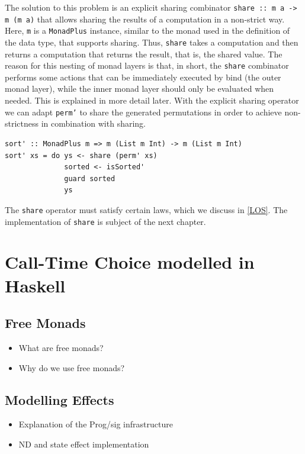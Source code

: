 \documentclass[a4paper, 11pt, fleqn, twoside]{scrreprt}
\begin{document}
The solution to this problem is an explicit sharing combinator 
\texttt{share :: m a -> m (m a)} that allows sharing the results 
of a computation in a non-strict way. Here, \texttt{m} is a 
\texttt{MonadPlus} instance, similar to the monad used in the 
definition of the data type, that supports sharing. Thus, 
\texttt{share} takes a  computation and then returns a computation 
that returns the result, that is, the shared value. The reason for this nesting 
of monad layers is that, in short, the \texttt{share} combinator 
performs some actions that can be immediately executed by bind (the outer monad 
layer), while the inner monad layer should only be evaluated when needed. This 
is explained in more detail later.
With the explicit sharing operator we can adapt \texttt{perm'} to
share the generated permutations in order to achieve non-strictness in 
combination with sharing.

\begin{verbatim}
sort' :: MonadPlus m => m (List m Int) -> m (List m Int)
sort' xs = do ys <- share (perm' xs)
              sorted <- isSorted'
              guard sorted
              ys
\end{verbatim}

The \texttt{share} operator must satisfy certain laws, which we 
discuss in \autoref{LOS}. The implementation of \texttt{share} is 
subject of the next chapter.

\chapter{Call-Time Choice modelled in Haskell}

\section{Free Monads}
\begin{itemize}
\item What are free monads?
\item Why do we use free monads?
\end{itemize}

\section{Modelling Effects}
\begin{itemize}
\item Explanation of the Prog/sig infrastructure
\item ND and state effect implementation 
\end{itemize}
\end{document}
